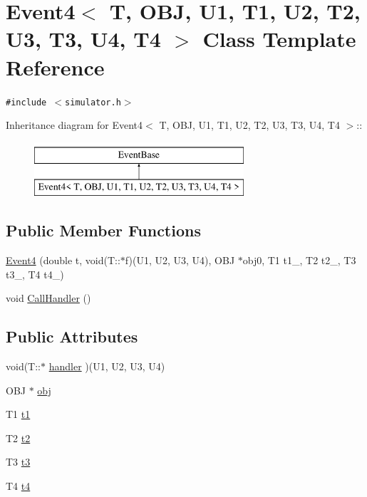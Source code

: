 \hypertarget{classEvent4}{
\section{Event4$<$ T, OBJ, U1, T1, U2, T2, U3, T3, U4, T4 $>$ Class Template Reference}
\label{classEvent4}
}
{\tt \#include $<$simulator.h$>$}

Inheritance diagram for Event4$<$ T, OBJ, U1, T1, U2, T2, U3, T3, U4, T4 $>$::\begin{figure}[H]
\begin{center}
\leavevmode
\includegraphics[height=2cm]{classEvent4}
\end{center}
\end{figure}
\subsection*{Public Member Functions}
\begin{CompactItemize}
\item 
\hyperlink{classEvent4_44d546a1df3e3421086701d66b103e3c}{Event4} (double t, void(T::$\ast$f)(U1, U2, U3, U4), OBJ $\ast$obj0, T1 t1\_, T2 t2\_, T3 t3\_, T4 t4\_)
\item 
void \hyperlink{classEvent4_69f98edf52e4f93f5cf0e0d5464f6ce0}{CallHandler} ()
\end{CompactItemize}
\subsection*{Public Attributes}
\begin{CompactItemize}
\item 
void(T::$\ast$ \hyperlink{classEvent4_13bc21430e9b5e4f41d9df447f455a57}{handler} )(U1, U2, U3, U4)
\item 
OBJ $\ast$ \hyperlink{classEvent4_214fd485cf467a8b3e7f48de2cce982a}{obj}
\item 
T1 \hyperlink{classEvent4_71f46004ef408ffe9c15d8eb4c295e9e}{t1}
\item 
T2 \hyperlink{classEvent4_61865aa3d8420f7e3cefab5dcb750f03}{t2}
\item 
T3 \hyperlink{classEvent4_44d2b08b43f20fac8f5cb3666e63cc52}{t3}
\item 
T4 \hyperlink{classEvent4_0a7fbdc85c74aececd3b997574ac0875}{t4}
\end{CompactItemize}
